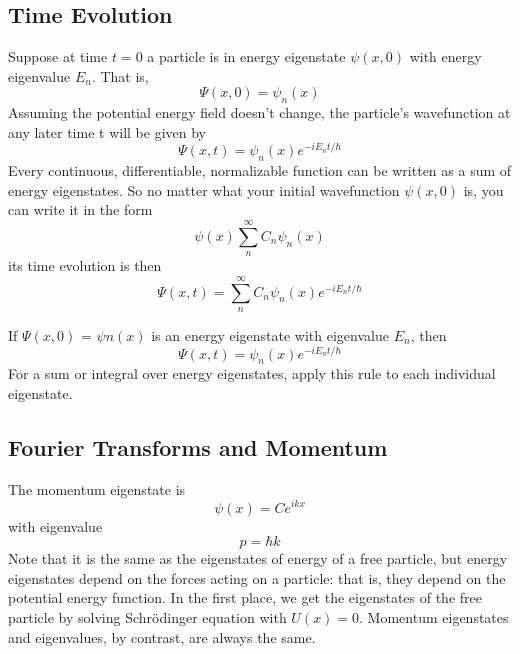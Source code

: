 \documentclass[../main.tex]{subfiles}
\begin{document}
\subsection*{Time Evolution}
Suppose at time $t = 0$ a particle is in energy eigenstate $\psi (x,0)$ with energy eigenvalue $E_n$.
That is,
\begin{equation*}
    \Psi (x,0)=\psi_n(x)
\end{equation*}
Assuming the potential energy field doesn't change, the particle's wavefunction at any later
time t will be given by
\begin{equation*}
    \Psi(x,t)=\psi_n (x)e^{-iE_n t/\hbar}
\end{equation*}
Every continuous, differentiable, normalizable function can be written as a sum of energy eigenstates. So no matter what your initial wavefunction $\psi (x,0)$ is, you can write it in the
form 
\begin{equation*}
    \psi (x)\sum_{n}^{\infty}C_n \psi_n(x)
\end{equation*}
its time evolution is then 
\begin{equation*}
    \Psi(x,t)=\sum_{n}^{\infty}C_n\psi_n (x)e^{-iE_n t/\hbar}
\end{equation*}

If $\Psi (x,0)$ = $\psi n(x)$ is an energy eigenstate with eigenvalue $E_n$, then
\begin{equation*}
    \Psi(x,t)=\psi_n (x)e^{-iE_n t/\hbar}
\end{equation*}
For a sum or integral over energy eigenstates, apply this rule to each individual eigenstate.

\subsection*{Fourier Transforms and Momentum}
The momentum eigenstate is 
\begin{equation*}
    \psi(x) = Ce^{ikx}
\end{equation*}
with eigenvalue
\begin{equation*}
    p = \hbar k
\end{equation*}
Note that it is the same as the eigenstates of energy of a free particle, but energy eigenstates depend on the forces acting on a particle: that is, they depend on the potential energy function. In the first place, we get the eigenstates of the free particle by solving Schrödinger equation with $U(x) = 0 $. Momentum eigenstates and eigenvalues, by contrast, are always the same.
\end{document}
